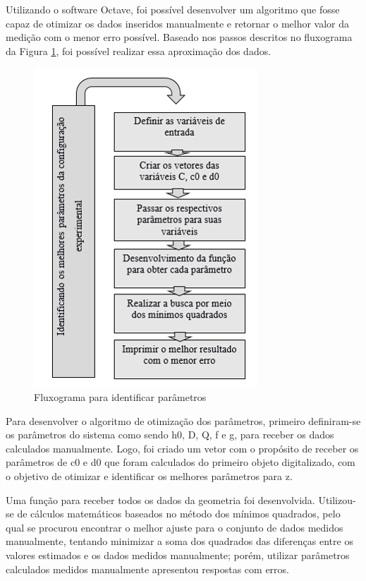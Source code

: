 \documentclass[a4paper, 12pt]{article}
\begin{document}
Utilizando o software Octave, foi possível desenvolver um algoritmo que fosse capaz de otimizar os dados inseridos manualmente e retornar o melhor valor da medição com o menor erro possível. Baseado nos passos descritos no fluxograma da Figura \ref{identificar parametros}, foi possível realizar essa aproximação dos dados.


\begin{figure}[H]
	\centering
		\includegraphics[scale=0.5]{fluxograma_identificar_parametros.png}
	\caption{Fluxograma para identificar parâmetros}
	\label{identificar parametros}
\end{figure}

Para desenvolver o algoritmo de otimização dos parâmetros, primeiro definiram-se os parâmetros do sistema como sendo h0, D, Q, f e g, para receber os dados calculados manualmente. Logo, foi criado um vetor com o propósito de receber os parâmetros de c0 e d0 que foram calculados do primeiro objeto digitalizado, com o objetivo de otimizar e identificar os melhores parâmetros para z.

Uma função para receber todos os dados da geometria foi desenvolvida. Utilizou-se de cálculos matemáticos baseados no método dos mínimos quadrados, pelo qual se procurou encontrar o melhor ajuste para o conjunto de dados medidos manualmente, tentando minimizar a soma dos quadrados das diferenças entre os valores estimados e os dados medidos manualmente; porém, utilizar parâmetros calculados medidos manualmente apresentou respostas com erros.
\end{document}

